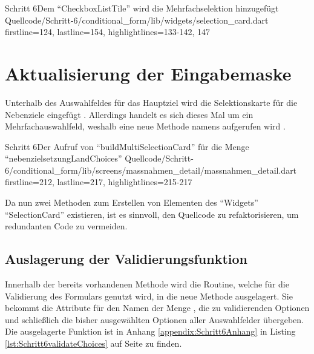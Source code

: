 \begin{alexlisting}{Schritt 6}{Dem \enquote{CheckboxListTile} wird die Mehrfachselektion hinzugefügt}
  {Quellcode/Schritt-6/conditional_form/lib/widgets/selection_card.dart}
  {firstline=124, lastline=154, highlightlines={133-142, 147}}
  \label{lst:Schritt6CheckboxListTile}
\end{alexlisting}


\clearpage
\section{Aktualisierung der Eingabemaske}

Unterhalb des Auswahlfeldes für das Hauptziel wird die Selektionskarte für die Nebenziele eingefügt \Lst{\ref{lst:Schritt6buildMultiSelectionCardnebenzielsetzungLandChoices}}.
Allerdings handelt es sich dieses Mal um ein Mehrfachauswahlfeld,
weshalb eine neue Methode namens  aufgerufen wird .

\begin{alexlisting}{Schritt 6}{Der Aufruf von \enquote{buildMultiSelectionCard} für die Menge \enquote{nebenzielsetzungLandChoices}}
  {Quellcode/Schritt-6/conditional_form/lib/screens/massnahmen_detail/massnahmen_detail.dart}
  {firstline=212, lastline=217, highlightlines={215-217}}
  \label{lst:Schritt6buildMultiSelectionCardnebenzielsetzungLandChoices}
\end{alexlisting}


Da nun zwei Methoden zum Erstellen von Elementen des \enquote{Widgets} \enquote{SelectionCard} existieren,
ist es sinnvoll,
den Quellcode zu refaktorisieren,
um redundanten Code zu vermeiden.

\subsection{Auslagerung der Validierungsfunktion}

Innerhalb der bereits vorhandenen Methode  wird die Routine,
welche für die Validierung des Formulars genutzt wird,
in die neue Methode   ausgelagert.
Sie bekommt die Attribute für den Namen der Menge ,
die zu validierenden Optionen 
und schließlich die bisher ausgewählten Optionen aller Auswahlfelder  übergeben.
Die ausgelagerte Funktion ist in Anhang \ref{appendix:Schritt6Anhang} in Listing \ref{lst:Schritt6validateChoices} auf Seite \pageref{lst:Schritt6validateChoices} zu finden.

